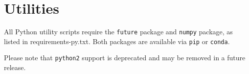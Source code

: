 \chapter{Utilities}

All Python utility scripts require the \texttt{future} package
and \texttt{numpy} package, as listed in requirements-py.txt. Both packages
are available via \texttt{pip} or \texttt{conda}.

Please note that \texttt{python2} support is deprecated and may be removed
in a future release.

%
%
%
%
%
%
%
%
%

